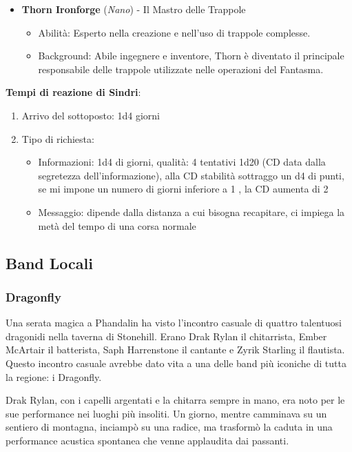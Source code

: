 \documentclass{article}
\begin{document}
\begin{itemize}
\item \textbf{Thorn Ironforge} (\textit{Nano}) - Il Mastro delle Trappole
  \begin{itemize}
    \item Abilità: Esperto nella creazione e nell'uso di trappole complesse.
    \item Background: Abile ingegnere e inventore, Thorn è diventato il principale responsabile delle trappole utilizzate nelle operazioni del Fantasma.
  \end{itemize}

\end{itemize}

\textbf{Tempi di reazione di Sindri}: 
\begin{enumerate}
    \item Arrivo del sottoposto: 1d4 giorni
    \item Tipo di richiesta: 
        \begin{itemize}
            \item Informazioni: 1d4 di giorni, qualità: 4 tentativi 1d20 (CD data dalla segretezza dell'informazione), alla CD stabilità sottraggo un d4 di punti, se mi impone un numero di giorni inferiore a 1 , la CD aumenta di 2 
            \item Messaggio: dipende dalla distanza a cui bisogna recapitare, ci impiega la metà del tempo di una corsa normale
        \end{itemize}
\end{enumerate}

          \subsection{Band Locali}
              \subsubsection{Dragonfly}
Una serata magica a Phandalin ha visto l'incontro casuale di quattro talentuosi dragonidi nella taverna di Stonehill. Erano Drak Rylan il chitarrista, Ember McArtair il batterista, Saph Harrenstone il cantante e Zyrik Starling il flautista. Questo incontro casuale avrebbe dato vita a una delle band più iconiche di tutta la regione: i Dragonfly.

Drak Rylan, con i capelli argentati e la chitarra sempre in mano, era noto per le sue performance nei luoghi più insoliti. Un giorno, mentre camminava su un sentiero di montagna, inciampò su una radice, ma trasformò la caduta in una performance acustica spontanea che venne applaudita dai passanti.
\end{document}
